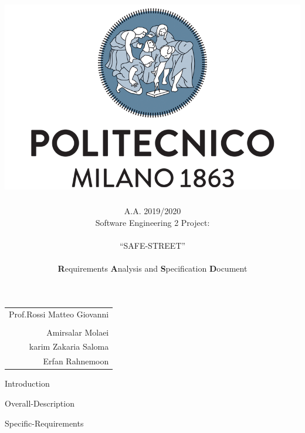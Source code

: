 \documentclass[english]{article}
\newcommand{\forcerighttext}[1]{
\vspace{0.2\textheight}
\par {\raggedleft \begin{tabular}{r}\ignorespaces
#1
\end{tabular}
\hspace{8em}
\vspace{1em}
\par}
}
\begin{document}
\begin{doublespace}

\title{\includegraphics[scale=0.4]{images/polimi}}

\author{A.A. 2019/2020\\
Software Engineering 2 Project: \\
\\
{\LARGE{}``SAFE-STREET''}\textbf{}\\
\\
\textbf{R}equirements \textbf{A}nalysis and \textbf{S}pecification
\textbf{D}ocument\\
}
\end{doublespace}

\maketitle
\thispagestyle{empty}
\forcerighttext{Prof.Rossi Matteo Giovanni\\
\\Amirsalar Molaei
\\karim Zakaria Saloma
\\Erfan Rahnemoon}


\newpage{}

\tableofcontents{}

\newpage

\listoffigures

\newpage

\listoftables

\newpage{}

{Introduction}

\newpage{}

{Overall-Description}

\newpage{}

{Specific-Requirements}
\end{document}
